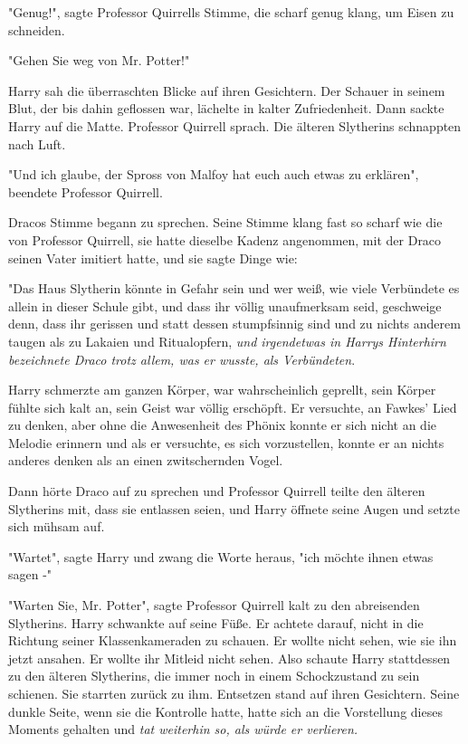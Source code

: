 {"Genug!", sagte Professor Quirrells Stimme, die scharf genug klang, um Eisen zu schneiden.

"Gehen Sie weg von Mr. Potter!"

Harry sah die überraschten Blicke auf ihren Gesichtern. Der Schauer in seinem Blut, der bis dahin geflossen war, lächelte in kalter Zufriedenheit. Dann sackte Harry auf die Matte. Professor Quirrell sprach. Die älteren Slytherins schnappten nach Luft.

"Und ich glaube, der Spross von Malfoy hat euch auch etwas zu erklären", beendete Professor Quirrell.

Dracos Stimme begann zu sprechen. Seine Stimme klang fast so scharf wie die von Professor Quirrell, sie hatte dieselbe Kadenz angenommen, mit der Draco seinen Vater imitiert hatte, und sie sagte Dinge wie:

"Das Haus Slytherin könnte in Gefahr sein und wer weiß, wie viele Verbündete es allein in dieser Schule gibt, und dass ihr völlig unaufmerksam seid, geschweige denn, dass ihr gerissen und statt dessen stumpfsinnig sind und zu nichts anderem taugen als zu Lakaien und Ritualopfern, \emph{und irgendetwas in Harrys Hinterhirn bezeichnete Draco trotz allem, was er wusste, als Verbündeten}.

Harry schmerzte am ganzen Körper, war wahrscheinlich geprellt, sein Körper fühlte sich kalt an, sein Geist war völlig erschöpft. Er versuchte, an Fawkes' Lied zu denken, aber ohne die Anwesenheit des Phönix konnte er sich nicht an die Melodie erinnern und als er versuchte, es sich vorzustellen, konnte er an nichts anderes denken als an einen zwitschernden Vogel.

Dann hörte Draco auf zu sprechen und Professor Quirrell teilte den älteren Slytherins mit, dass sie entlassen seien, und Harry öffnete seine Augen und setzte sich mühsam auf.

"Wartet", sagte Harry und zwang die Worte heraus, "ich möchte ihnen etwas sagen -"

"Warten Sie, Mr. Potter", sagte Professor Quirrell kalt zu den abreisenden Slytherins. Harry schwankte auf seine Füße. Er achtete darauf, nicht in die Richtung seiner Klassenkameraden zu schauen. Er wollte nicht sehen, wie sie ihn jetzt ansahen. Er wollte ihr Mitleid nicht sehen. Also schaute Harry stattdessen zu den älteren Slytherins, die immer noch in einem Schockzustand zu sein schienen. Sie starrten zurück zu ihm. Entsetzen stand auf ihren Gesichtern. Seine dunkle Seite, wenn sie die Kontrolle hatte, hatte sich an die Vorstellung dieses Moments gehalten und \emph{tat weiterhin so, als würde er verlieren.}

}
